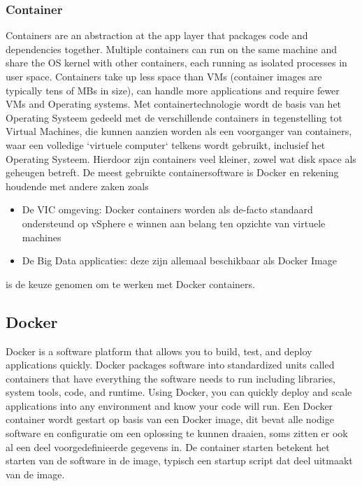 \subsubsection{Container}
Containers are an abstraction at the app layer that packages code and dependencies together. Multiple containers can run on the same machine and share the OS kernel with other containers, each running as isolated processes in user space. Containers take up less space than VMs (container images are typically tens of MBs in size), can handle more applications and require fewer VMs and Operating systems.\autocite{Docker2023a}
\newline
\newline
Met containertechnologie wordt de basis van het Operating Systeem gedeeld met de verschillende containers in tegenstelling tot Virtual Machines, die kunnen aanzien worden als een voorganger van containers, waar een volledige `virtuele computer` telkens wordt gebruikt, inclusief het Operating Systeem. Hierdoor zijn containers veel kleiner, zowel wat disk space als geheugen betreft.
\newline
\newline
De meest gebruikte containersoftware is Docker en rekening houdende met andere zaken zoals
\begin{itemize}
    \item De VIC omgeving: Docker containers worden als de-facto standaard ondersteund op vSphere e winnen aan belang ten opzichte van virtuele machines
    \item De Big Data applicaties: deze zijn allemaal beschikbaar als Docker Image
\end{itemize}
is de keuze genomen om te werken met Docker containers.

\subsection{Docker}
Docker is a software platform that allows you to build, test, and deploy applications quickly. Docker packages software into standardized units called containers that have everything the software needs to run including libraries, system tools, code, and runtime. Using Docker, you can quickly deploy and scale applications into any environment and know your code will run. \autocite{AwsAmazon2023}
\newline
\newline
Een Docker container wordt gestart op basis van een Docker image, dit bevat alle nodige software en configuratie om een oplossing te kunnen draaien, soms zitten er ook al een deel voorgedefinieerde gegevens in. De container starten betekent het starten van de software in de image, typisch een startup script dat deel uitmaakt van de image.

